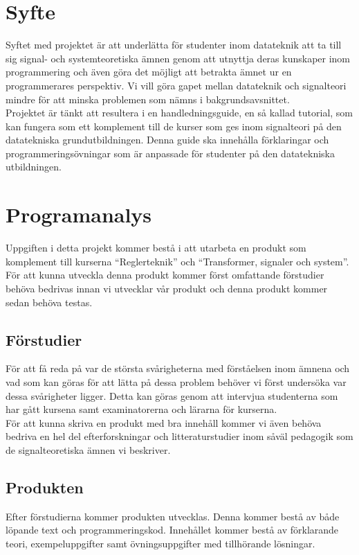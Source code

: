 \documentclass{article}
\begin{document}
\section{Syfte}
Syftet med projektet är att underlätta för studenter inom datateknik att ta till sig signal- och systemteoretiska ämnen genom att utnyttja deras kunskaper inom programmering och även göra det möjligt att betrakta ämnet ur en programmerares perspektiv. Vi vill göra gapet mellan datateknik och signalteori mindre för att minska problemen som nämns i bakgrundsavsnittet.\\
\newline
Projektet är tänkt att resultera i en handledningsguide, en så kallad tutorial, som kan fungera som ett komplement till de kurser som ges inom signalteori på den datatekniska grundutbildningen. Denna guide ska innehålla förklaringar och programmeringsövningar som är anpassade för studenter på den datatekniska utbildningen.

\section{Programanalys}
Uppgiften i detta projekt kommer bestå i att utarbeta en produkt som komplement till kurserna “Reglerteknik” och “Transformer, signaler och system”. För att kunna utveckla denna produkt kommer först omfattande förstudier behöva bedrivas innan vi utvecklar vår produkt och denna produkt kommer sedan behöva testas.
\subsection{Förstudier}
För att få reda på var de största svårigheterna med förståelsen inom ämnena och vad som kan göras för att lätta på dessa problem behöver vi först undersöka var dessa svårigheter ligger. Detta kan göras genom att intervjua studenterna som har gått kursena samt examinatorerna och lärarna för kurserna.\\
\newline
För att kunna skriva en produkt med bra innehåll kommer vi även behöva bedriva en hel del efterforskningar och litteraturstudier inom såväl pedagogik som de signalteoretiska ämnen vi beskriver.
\subsection{Produkten}
Efter förstudierna kommer produkten utvecklas. Denna kommer bestå av både löpande text och programmeringskod. Innehållet kommer bestå av förklarande teori, exempeluppgifter samt övningsuppgifter med tillhörande lösningar.
\end{document}
